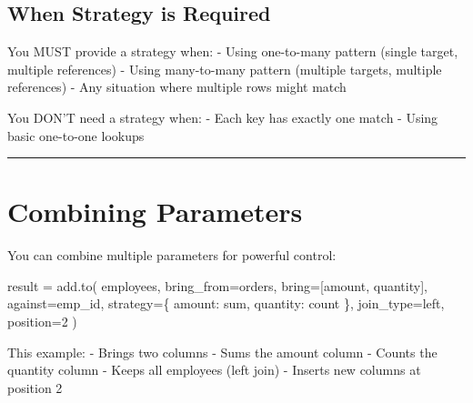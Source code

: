 \documentclass[
  letterpaper,
]{scrbook}
\newenvironment{Shaded}{\begin{snugshade}}{\end{snugshade}}
\newcommand{\DecValTok}[1]{\textcolor[rgb]{0.68,0.00,0.00}{#1}}
\newcommand{\NormalTok}[1]{\textcolor[rgb]{0.00,0.23,0.31}{#1}}
\newcommand{\OperatorTok}[1]{\textcolor[rgb]{0.37,0.37,0.37}{#1}}
\newcommand{\StringTok}[1]{\textcolor[rgb]{0.13,0.47,0.30}{#1}}
\begin{document}
\subsection{When Strategy is Required}\label{when-strategy-is-required}

You MUST provide a strategy when: - Using one-to-many pattern (single
target, multiple references) - Using many-to-many pattern (multiple
targets, multiple references) - Any situation where multiple rows might
match

You DON'T need a strategy when: - Each key has exactly one match - Using
basic one-to-one lookups

\begin{center}\rule{0.5\linewidth}{0.5pt}\end{center}

\section{Combining Parameters}\label{combining-parameters}

You can combine multiple parameters for powerful control:

\begin{Shaded}
\begin{Highlighting}[]
\NormalTok{result }\OperatorTok{=}\NormalTok{ add.to(}
\NormalTok{    employees,}
\NormalTok{    bring\_from}\OperatorTok{=}\NormalTok{orders,}
\NormalTok{    bring}\OperatorTok{=}\NormalTok{[}\StringTok{\textquotesingle{}amount\textquotesingle{}}\NormalTok{, }\StringTok{\textquotesingle{}quantity\textquotesingle{}}\NormalTok{],}
\NormalTok{    against}\OperatorTok{=}\StringTok{\textquotesingle{}emp\_id\textquotesingle{}}\NormalTok{,}
\NormalTok{    strategy}\OperatorTok{=}\NormalTok{\{}
        \StringTok{\textquotesingle{}amount\textquotesingle{}}\NormalTok{: }\StringTok{\textquotesingle{}sum\textquotesingle{}}\NormalTok{,}
        \StringTok{\textquotesingle{}quantity\textquotesingle{}}\NormalTok{: }\StringTok{\textquotesingle{}count\textquotesingle{}}
\NormalTok{    \},}
\NormalTok{    join\_type}\OperatorTok{=}\StringTok{\textquotesingle{}left\textquotesingle{}}\NormalTok{,}
\NormalTok{    position}\OperatorTok{=}\DecValTok{2}
\NormalTok{)}
\end{Highlighting}
\end{Shaded}

This example: - Brings two columns - Sums the amount column - Counts the
quantity column - Keeps all employees (left join) - Inserts new columns
at position 2
\end{document}
